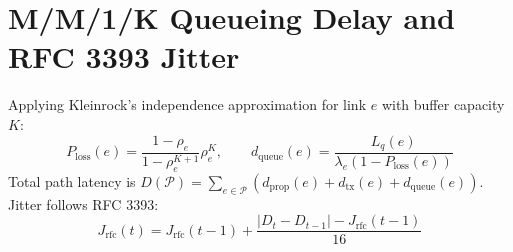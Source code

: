 \documentclass[12pt,a4paper,oneside]{report}
\begin{document}
\section{M/M/1/K Queueing Delay and RFC 3393 Jitter}
Applying Kleinrock's independence approximation for link $e$ with buffer capacity $K$:
\begin{equation}
P_{\text{loss}}(e) = \frac{1 - \rho_e}{1 - \rho_e^{K+1}} \rho_e^K, \qquad d_{\text{queue}}(e) = \frac{L_q(e)}{\lambda_e (1 - P_{\text{loss}}(e))}
\end{equation}
Total path latency is $D(\mathcal{P}) = \sum_{e \in \mathcal{P}} (d_{\text{prop}}(e) + d_{\text{tx}}(e) + d_{\text{queue}}(e))$. Jitter follows RFC 3393:
\begin{equation}
J_{\text{rfc}}(t) = J_{\text{rfc}}(t-1) + \frac{|D_t - D_{t-1}| - J_{\text{rfc}}(t-1)}{16}
\end{equation}
\end{document}
